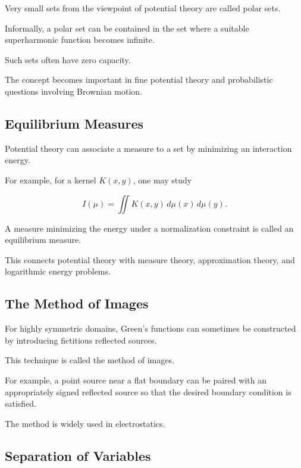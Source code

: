 Very small sets from the viewpoint of potential theory are called polar
sets.

Informally, a polar set can be contained in the set where a suitable
superharmonic function becomes infinite.

Such sets often have zero capacity.

The concept becomes important in fine potential theory and probabilistic
questions involving Brownian motion.

\subsection{Equilibrium Measures}
\label{subsec:equilibrium-measures}

Potential theory can associate a measure to a set by minimizing an
interaction energy.

For example, for a kernel \(K(x,y)\), one may study

\[
\boxed{
I(\mu)
=
\iint
K(x,y)\,d\mu(x)\,d\mu(y).
}
\]

A measure minimizing the energy under a normalization constraint is
called an equilibrium measure.

This connects potential theory with measure theory, approximation theory,
and logarithmic energy problems.

\subsection{The Method of Images}
\label{subsec:method-of-images}

For highly symmetric domains, Green's functions can sometimes be
constructed by introducing fictitious reflected sources.

This technique is called the method of images.

For example, a point source near a flat boundary can be paired with an
appropriately signed reflected source so that the desired boundary
condition is satisfied.

The method is widely used in electrostatics.

\subsection{Separation of Variables}
\label{subsec:potential-separation-variables}


